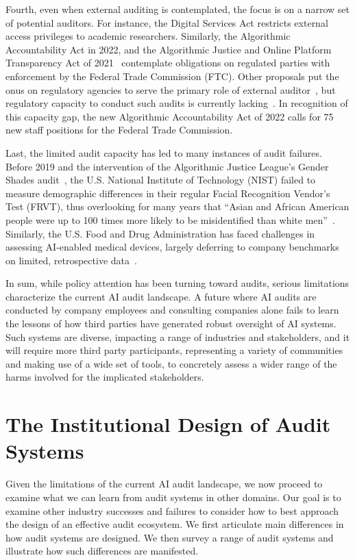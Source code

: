 \documentclass[sigconf]{acmart}
\begin{document}
Fourth, even when external auditing is contemplated, the focus is on a narrow set of potential auditors. For instance, the Digital Services Act restricts external access privileges to academic researchers. Similarly, the Algorithmic Accountability Act in 2022, and the Algorithmic Justice and Online Platform Transparency Act of 2021~\cite{noauthorsenator2021} contemplate obligations on regulated parties with enforcement by the Federal Trade Commission (FTC). Other proposals put the onus on regulatory agencies to serve the primary role of external auditor~\cite{kearns2020ethical}, but regulatory capacity to conduct such audits is currently lacking~\cite{engstrom2020algorithmic}. In recognition of this capacity gap, the new Algorithmic Accountability Act of 2022 calls for 75 new staff positions for the Federal Trade Commission. 

Last, the limited audit capacity has led to many instances of audit failures. Before 2019 and the intervention of the Algorithmic Justice League’s Gender Shades audit~\cite{buolamwini2018gender}, the U.S. National Institute of Technology (NIST) failed to measure demographic differences in their regular Facial Recognition Vendor’s Test (FRVT), thus overlooking for many years that “Asian and African American people were up to 100 times more likely to be misidentified than white men”~\cite{grother2019face}. Similarly, the U.S. Food and Drug Administration has faced challenges in assessing AI-enabled medical devices, largely deferring to company benchmarks on limited, retrospective data~\cite{wu2021medical}. 

In sum, while policy attention has been turning toward audits, serious limitations characterize the current AI audit landscape. A future where AI audits are conducted by company employees and consulting companies alone fails to learn the lessons of how third parties have generated robust oversight of AI systems. Such systems are diverse, impacting a range of industries and stakeholders, and it will require more third party participants, representing a variety of communities and making use of a wide set of tools, to concretely assess a wider range of the harms involved for the implicated stakeholders.

\vspace{-3mm}
\section{The Institutional Design of Audit Systems}

Given the limitations of the current AI audit landscape, we now proceed to examine what we can learn from audit systems in other domains. Our goal is to examine other industry successes and failures to consider how to best approach the design of an effective audit ecosystem. 
We first articulate main differences in how audit systems are designed. We then survey a range of audit systems and illustrate how such differences are manifested. 
\end{document}
